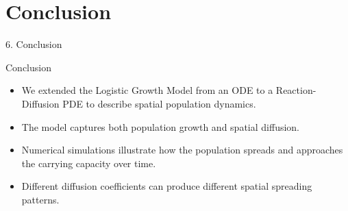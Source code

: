 \documentclass[10pt]{beamer}
\begin{document}
\section{Conclusion}
    \begin{frame}{6. Conclusion}
      \begin{block}{Conclusion}
          \begin{itemize}
              \item We extended the Logistic Growth Model from an ODE to a Reaction-Diffusion PDE to describe spatial population dynamics.
              
              \item The model captures both population growth and spatial diffusion.
              
              \item Numerical simulations illustrate how the population spreads and approaches the carrying capacity over time.
              
              \item Different diffusion coefficients can produce different spatial spreading patterns.
          \end{itemize}
      \end{block}
    \end{frame}
\end{document}

